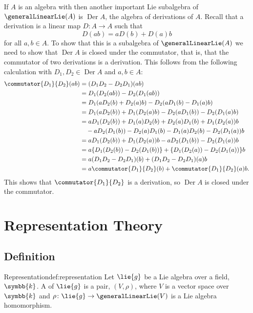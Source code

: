 \documentclass[fleqn]{NotesClass}
\renewcommand{\field}{\symbb{k}}
\DeclareMathOperator{\Der}{Der}
\begin{document}
    If \(A\) is an algebra with then another important Lie subalgebra of \(\generalLinearLie(A)\) is \(\Der A\), the algebra of derivations of \(A\).
    Recall that a derivation is a linear map \(D \colon A \to A\) such that
    \begin{equation}
        D(ab) = aD(b) + D(a)b
    \end{equation}
    for all \(a, b \in A\).
    To show that this is a subalgebra of \(\generalLinearLie(A)\) we need to show that \(\Der A\) is closed under the commutator, that is, that the commutator of two derivations is a derivation.
    This follows from the following calculation with \(D_1, D_2 \in \Der A\) and \(a, b \in A\):
    \begingroup
    \allowdisplaybreaks
    \begin{align}
        \commutator{D_1}{D_2}(ab) &= (D_1D_2 - D_2D_1)(ab)\\
        &= D_1(D_2(ab)) - D_2(D_1(ab)) \notag\\
        &= D_1(aD_2(b) + D_2(a)b) - D_2(aD_1(b) - D_1(a)b) \notag\\
        &= D_1(aD_2(b)) + D_1(D_2(a)b) - D_2(aD_1(b)) - D_2(D_1(a)b) \notag\\
        &= aD_1(D_2(b)) + D_1(a)D_2(b) + D_2(a)D_1(b) + D_1(D_2(a))b \notag\\
        &\quad- aD_2(D_1(b)) - D_2(a)D_1(b) - D_1(a)D_2(b) - D_2(D_1(a))b \notag\\
        &= aD_1(D_2(b)) + D_1(D_2(a))b - aD_2(D_1(b)) - D_2(D_1(a))b \notag\\
        &= a\{D_1(D_2(b)) - D_2(D_1(b))\} + \{D_1(D_2(a)) - D_2(D_1(a))\}b \notag\\
        &= a(D_1D_2 - D_2D_1)(b) + (D_1D_2 - D_2D_1)(a)b \notag\\
        &= a\commutator{D_1}{D_2}(b) + \commutator{D_1}{D_2}(a)b. \notag
    \end{align}
    \endgroup
    This shows that \(\commutator{D_1}{D_2}\) is a derivation, so \(\Der A\) is closed under the commutator.
    
    \chapter{Representation Theory}
    \section{Definition}
    \begin{dfn}{Representation}{def:representation}
        Let \(\lie{g}\) be a Lie algebra over a field, \(\field\).
        A  of \(\lie{g}\) is a pair, \((V, \rho)\), where \(V\) is a vector space over \(\field\) and \(\rho \colon \lie{g} \to \generalLinearLie(V)\) is a Lie algebra homomorphism.
    \end{dfn}
    
\end{document}
